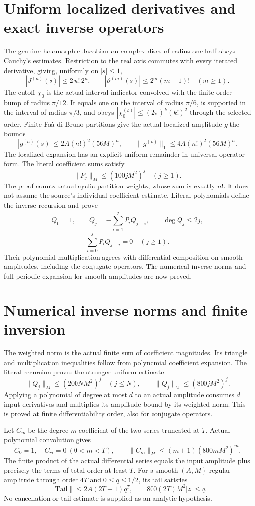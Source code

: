\documentclass[11pt]{article}
\begin{document}
\section*{Uniform localized derivatives and exact inverse operators}
The genuine holomorphic Jacobian on complex discs of radius one half obeys
Cauchy's estimates. Restriction to the real axis commutes with every
iterated derivative, giving, uniformly on $|s|\le1$,
\[
|J^{(n)}(s)|\le2\,n!\,2^n,\qquad
|\vartheta^{(m)}(s)|\le2^m(m-1)!\quad(m\ge1).
\]
The cutoff $\chi_0$ is the actual interval indicator convolved with the finite-order
bump of radius $\pi/12$. It equals one on the interval of radius $\pi/6$, is
supported in the interval of radius $\pi/3$, and obeys
$|\chi_0^{(k)}|\le(2\pi)^k(k!)^2$ through the selected order.
Finite Faà di Bruno partitions give the actual localized amplitude $g$ the bounds
\[
|g^{(n)}(s)|\le2A(n!)^2(56M)^n,
\qquad \|g^{(n)}\|_1\le4A(n!)^2(56M)^n.
\]
The localized expansion has an explicit uniform remainder in universal
operator form. The literal coefficient sums satisfy
\[
\|P_j\|_M\le(100jM^2)^j\quad(j\ge1).
\]
The proof counts actual cyclic partition weights, whose sum is exactly $n!$.
It does not assume the source's individual coefficient estimate. Literal
polynomials define the inverse recursion and prove
\[
Q_0=1,\qquad Q_j=-\sum_{i=1}^jP_iQ_{j-i},\qquad \deg Q_j\le2j,
\]
\[
\sum_{i=0}^jP_iQ_{j-i}=0\quad(j\ge1).
\]
Their polynomial multiplication agrees with differential composition on
smooth amplitudes, including the conjugate operators. The numerical inverse
norms and full periodic expansion for smooth amplitudes are now proved.

\newpage
\section*{Numerical inverse norms and finite inversion}
The weighted norm is the actual finite sum of coefficient magnitudes. Its
triangle and multiplication inequalities follow from polynomial coefficient
expansion. The literal recursion proves the stronger uniform estimate
\[
\|Q_j\|_M\le(200NM^2)^j\quad(j\le N),\qquad
\|Q_j\|_M\le(800jM^2)^j.
\]
Applying a polynomial of degree at most $d$ to an actual amplitude consumes $d$
input derivatives and multiplies its amplitude bound by its weighted norm.
This is proved at finite differentiability order, also for conjugate operators.

Let $C_m$ be the degree-$m$ coefficient of the two series truncated at $T$.
Actual polynomial convolution gives
\[
C_0=1,\quad C_m=0\ (0<m<T),\qquad
\|C_m\|_M\le(m+1)(800mM^2)^m.
\]
The finite product of the actual differential series equals the input
amplitude plus precisely the terms of total order at least $T$. For a smooth
$(A,M)$-regular amplitude through order $4T$ and $0\le q\le1/2$, its tail satisfies
\[
\|\mathrm{Tail}\|\le2A(2T+1)q^T,
\qquad 800(2T)M^2|z|\le q.
\]
No cancellation or tail estimate is supplied as an analytic hypothesis.
\end{document}
